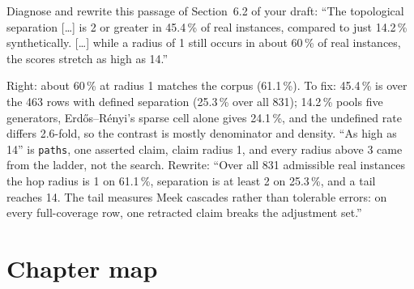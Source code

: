 \begin{exercicio}[metodo=diagnosis,conceito=regra-livre]
Diagnose and rewrite this passage of Section~6.2 of your draft: ``The topological separation [\dots] is 2 or greater in 45.4\,\% of
real instances, compared to just 14.2\,\% synthetically. [\dots] while a radius of 1 still occurs in about 60\,\% of real instances,
the scores stretch as high as 14.''
\end{exercicio}
\begin{solucao}
Right: about 60\,\% at radius 1 matches the corpus (61.1\,\%). To fix: 45.4\,\% is over the 463 rows with defined separation (25.3\,\% over all
831); 14.2\,\% pools five generators, Erdős--Rényi's sparse cell alone gives 24.1\,\%, and the undefined rate differs 2.6-fold, so
the contrast is mostly denominator and density. ``As high as 14'' is \texttt{paths},
one asserted claim, claim radius 1, and every radius above 3 came from the ladder, not the search. Rewrite: ``Over all 831 admissible real
instances the hop radius is 1 on 61.1\,\%, separation is at least 2 on 25.3\,\%, and a tail reaches 14. The tail measures Meek cascades
rather than tolerable errors: on every full-coverage row, one retracted claim breaks the adjustment set.''
\end{solucao}

\section*{Chapter map}
\begin{center}
\end{center}
